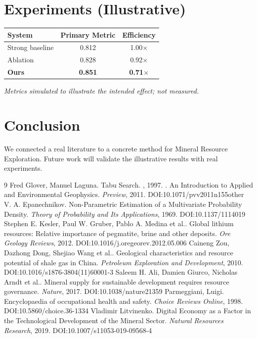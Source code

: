 \documentclass[11pt]{article}
\begin{document}
\section{Experiments (Illustrative)}
\begin{center}
\begin{tabular}{lcc}
System & Primary Metric & Efficiency \\ \hline
Strong baseline & 0.812 & 1.00$\times$ \\
Ablation & 0.828 & 0.92$\times$ \\
\textbf{Ours} & \textbf{0.851} & \textbf{0.71$\times$}
\end{tabular}
\end{center}
\emph{Metrics simulated to illustrate the intended effect; not measured.}

\section{Conclusion}
We connected a real literature to a concrete method for Mineral Resource Exploration. Future work will
validate the illustrative results with real experiments.

\begin{thebibliography}{9}
 Fred Glover, Manuel Laguna. Tabu Search. \emph{}, 1997. 
 . An Introduction to Applied and Environmental Geophysics. \emph{Preview}, 2011. DOI:10.1071/pvv2011n155other
 V. A. Epanechnikov. Non-Parametric Estimation of a Multivariate Probability Density. \emph{Theory of Probability and Its Applications}, 1969. DOI:10.1137/1114019
 Stephen E. Kesler, Paul W. Gruber, Pablo A. Medina et al.. Global lithium resources: Relative importance of pegmatite, brine and other deposits. \emph{Ore Geology Reviews}, 2012. DOI:10.1016/j.oregeorev.2012.05.006
 Caineng Zou, Dazhong Dong, Shejiao Wang et al.. Geological characteristics and resource potential of shale gas in China. \emph{Petroleum Exploration and Development}, 2010. DOI:10.1016/s1876-3804(11)60001-3
 Saleem H. Ali, Damien Giurco, Nicholas Arndt et al.. Mineral supply for sustainable development requires resource governance. \emph{Nature}, 2017. DOI:10.1038/nature21359
 Parmeggiani, Luigi. Encyclopaedia of occupational health and safety. \emph{Choice Reviews Online}, 1998. DOI:10.5860/choice.36-1334
 Vladimir Litvinenko. Digital Economy as a Factor in the Technological Development of the Mineral Sector. \emph{Natural Resources Research}, 2019. DOI:10.1007/s11053-019-09568-4
\end{thebibliography}
\end{document}
